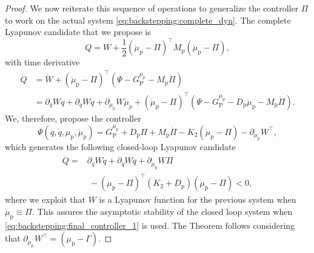 \begin{proof}
	We now reiterate this sequence of operations to generalize the controller $\Pi$ to work on the actual system \eqref{eq:backstepping:complete_dyn}.
	The complete Lyapunov candidate that we propose is
	\begin{equation}
		Q = W + \frac{1}{2}(\dot{\mu}_\mathrm{p} - \Pi)^{\top} M_\mathrm{p} (\dot{\mu}_\mathrm{p} - \Pi),
	\end{equation}
	with time derivative
	\begin{equation*}
		\begin{split}
			\dot{Q} &= \dot{W} + (\dot{\mu}_\mathrm{p} - \Pi)^{\top} (\Psi - G_{\mathrm{P}}^{\mu_\mathrm{p}} - M_\mathrm{p} \dot{\Pi}) \\
			 &= \partial_{q} W \dot{q} + \partial_{\dot{q}} W \ddot{q} + \partial_{\mu_\mathrm{p}} W \dot{\mu}_p + (\dot{\mu}_\mathrm{p} - \Pi)^{\top} (\Psi - G_{\mathrm{P}}^{\mu_\mathrm{p}} - D_\mathrm{p} \dot{\mu}_\mathrm{p} - M_\mathrm{p} \dot{\Pi}) .
		\end{split}
	\end{equation*}
	We, therefore, propose the controller
	\begin{equation}\label{eq:backstepping:final_controller_1}
	    \Psi(q, \dot{q}, \mu_\mathrm{p}, \dot{\mu}_\mathrm{p}) = G_{\mathrm{P}}^{\mu_\mathrm{p}} + D_\mathrm{p} \Pi + M_\mathrm{p} \dot{\Pi} - K_2 (\dot{\mu}_\mathrm{p} - \Pi) 
	    - \partial_{\mu_\mathrm{p}} W^{\top}\!,
	\end{equation}
	which generates the following closed-loop Lyapunov candidate
	\begin{equation}
	    \begin{split}
			\dot{Q} =& \partial_{q} W \dot{q} + \partial_{\dot{q}} W \ddot{q} + \partial_{\mu_\mathrm{p}} W \Pi \\
			&\: - (\dot{\mu}_\mathrm{p} - \Pi)^{\top} (K_2 + D_\mathrm{p}) (\dot{\mu}_\mathrm{p} - \Pi)
			< 0,
	    \end{split}
	\end{equation}
	where we exploit that $W$ is a Lyapunov function for the previous system when $\dot{\mu}_\mathrm{p} \equiv \Pi$. This assures the asymptotic stability of the closed loop system when \eqref{eq:backstepping:final_controller_1} is used. The Theorem follows considering that $\partial_{\mu_\mathrm{p}} W^{\top} = (\mu_\mathrm{p} - \Gamma)$.
	

\end{proof}
